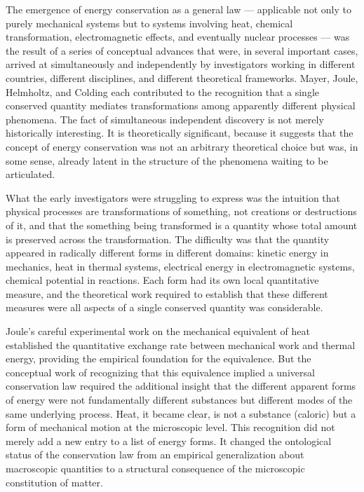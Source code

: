 \documentclass[12pt,openany]{book}
\theoremstyle{plain}
\theoremstyle{definition}
\theoremstyle{remark}
\begin{document}
The emergence of energy conservation as a general law — applicable not only to purely mechanical systems but to systems involving heat, chemical transformation, electromagnetic effects, and eventually nuclear processes — was the result of a series of conceptual advances that were, in several important cases, arrived at simultaneously and independently by investigators working in different countries, different disciplines, and different theoretical frameworks. Mayer, Joule, Helmholtz, and Colding each contributed to the recognition that a single conserved quantity mediates transformations among apparently different physical phenomena. The fact of simultaneous independent discovery is not merely historically interesting. It is theoretically significant, because it suggests that the concept of energy conservation was not an arbitrary theoretical choice but was, in some sense, already latent in the structure of the phenomena waiting to be articulated.

What the early investigators were struggling to express was the intuition that physical processes are transformations of something, not creations or destructions of it, and that the something being transformed is a quantity whose total amount is preserved across the transformation. The difficulty was that the quantity appeared in radically different forms in different domains: kinetic energy in mechanics, heat in thermal systems, electrical energy in electromagnetic systems, chemical potential in reactions. Each form had its own local quantitative measure, and the theoretical work required to establish that these different measures were all aspects of a single conserved quantity was considerable.

Joule's careful experimental work on the mechanical equivalent of heat established the quantitative exchange rate between mechanical work and thermal energy, providing the empirical foundation for the equivalence. But the conceptual work of recognizing that this equivalence implied a universal conservation law required the additional insight that the different apparent forms of energy were not fundamentally different substances but different modes of the same underlying process. Heat, it became clear, is not a substance (caloric) but a form of mechanical motion at the microscopic level. This recognition did not merely add a new entry to a list of energy forms. It changed the ontological status of the conservation law from an empirical generalization about macroscopic quantities to a structural consequence of the microscopic constitution of matter.
\end{document}
